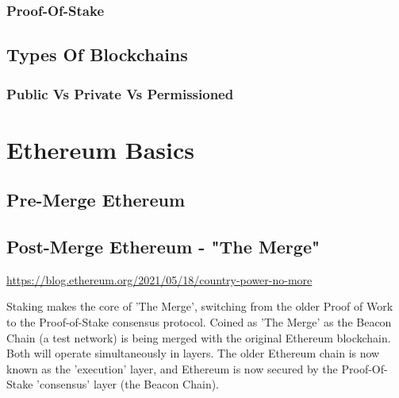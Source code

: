
\subsubsection{Proof-Of-Stake}






\subsection{Types Of Blockchains}




\subsubsection{Public Vs Private Vs Permissioned}



\section{Ethereum Basics}



\subsection{Pre-Merge Ethereum}

\subsection{Post-Merge Ethereum - "The Merge"}

\url{https://blog.ethereum.org/2021/05/18/country-power-no-more}

Staking makes the core of 'The Merge', switching from the older Proof of Work to the Proof-of-Stake consensus protocol. Coined as 'The Merge' as the Beacon Chain (a test network) is being merged with the original Ethereum blockchain. Both will operate simultaneously in layers. The older Ethereum chain is now known as the 'execution' layer, and Ethereum is now secured by the Proof-Of-Stake 'consensus' layer (the Beacon Chain). 

